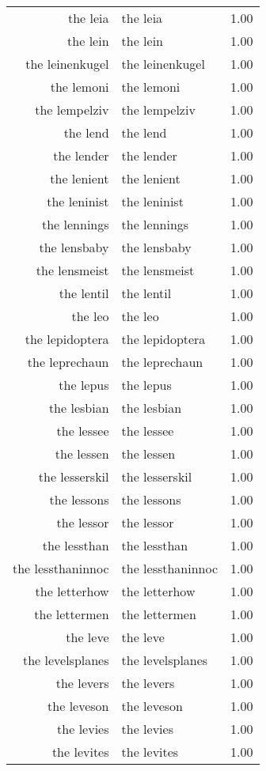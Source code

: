 \begin{table}[ht]
\begin{tabular}{rlr}
  the leia & the leia & 1.00 \\ 
  the lein & the lein & 1.00 \\ 
  the leinenkugel & the leinenkugel & 1.00 \\ 
  the lemoni & the lemoni & 1.00 \\ 
  the lempelziv & the lempelziv & 1.00 \\ 
  the lend & the lend & 1.00 \\ 
  the lender & the lender & 1.00 \\ 
  the lenient & the lenient & 1.00 \\ 
  the leninist & the leninist & 1.00 \\ 
  the lennings & the lennings & 1.00 \\ 
  the lensbaby & the lensbaby & 1.00 \\ 
  the lensmeist & the lensmeist & 1.00 \\ 
  the lentil & the lentil & 1.00 \\ 
  the leo & the leo & 1.00 \\ 
  the lepidoptera & the lepidoptera & 1.00 \\ 
  the leprechaun & the leprechaun & 1.00 \\ 
  the lepus & the lepus & 1.00 \\ 
  the lesbian & the lesbian & 1.00 \\ 
  the lessee & the lessee & 1.00 \\ 
  the lessen & the lessen & 1.00 \\ 
  the lesserskil & the lesserskil & 1.00 \\ 
  the lessons & the lessons & 1.00 \\ 
  the lessor & the lessor & 1.00 \\ 
  the lessthan & the lessthan & 1.00 \\ 
  the lessthaninnoc & the lessthaninnoc & 1.00 \\ 
  the letterhow & the letterhow & 1.00 \\ 
  the lettermen & the lettermen & 1.00 \\ 
  the leve & the leve & 1.00 \\ 
  the levelsplanes & the levelsplanes & 1.00 \\ 
  the levers & the levers & 1.00 \\ 
  the leveson & the leveson & 1.00 \\ 
  the levies & the levies & 1.00 \\ 
  the levites & the levites & 1.00 \\ 

\end{tabular}
\end{table}

